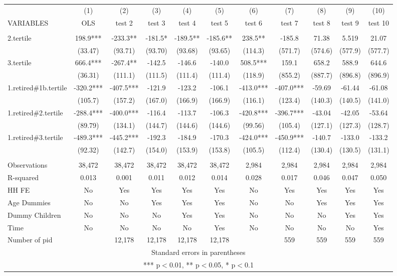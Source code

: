 \begin{tabular}{lcccccccccc} \hline
 & (1) & (2) & (3) & (4) & (5) & (6) & (7) & (8) & (9) & (10) \\
VARIABLES & OLS & test 2 & test 3 & test 4 & test 5 & test 6 & test 7 & test 8 & test 9 & test 10 \\ \hline
 &  &  &  &  &  &  &  &  &  &  \\
2.tertile & 198.9*** & -233.3** & -181.5* & -189.5** & -185.6** & 238.5** & -185.8 & 71.38 & 5.519 & 21.07 \\
 & (33.47) & (93.71) & (93.70) & (93.68) & (93.65) & (114.3) & (571.7) & (574.6) & (577.9) & (577.7) \\
3.tertile & 666.4*** & -267.4** & -142.5 & -146.6 & -140.0 & 508.5*** & 159.1 & 658.2 & 588.9 & 644.6 \\
 & (36.31) & (111.1) & (111.5) & (111.4) & (111.4) & (118.9) & (855.2) & (887.7) & (896.8) & (896.9) \\
1.retired\#1b.tertile & -320.2*** & -407.5*** & -121.9 & -123.2 & -106.1 & -413.0*** & -407.0*** & -59.69 & -61.44 & -61.08 \\
 & (105.7) & (157.2) & (167.0) & (166.9) & (166.9) & (116.1) & (123.4) & (140.3) & (140.5) & (141.0) \\
1.retired\#2.tertile & -288.4*** & -400.0*** & -116.4 & -113.7 & -106.3 & -420.8*** & -396.7*** & -43.04 & -42.05 & -53.64 \\
 & (89.79) & (134.1) & (144.7) & (144.6) & (144.6) & (99.56) & (105.4) & (127.1) & (127.3) & (128.7) \\
1.retired\#3.tertile & -489.3*** & -445.2*** & -192.3 & -184.9 & -170.3 & -424.0*** & -450.9*** & -140.7 & -133.0 & -133.2 \\
 & (92.32) & (142.7) & (154.0) & (153.9) & (153.8) & (105.5) & (112.4) & (130.4) & (130.5) & (131.1) \\
 &  &  &  &  &  &  &  &  &  &  \\
Observations & 38,472 & 38,472 & 38,472 & 38,472 & 38,472 & 2,984 & 2,984 & 2,984 & 2,984 & 2,984 \\
R-squared & 0.013 & 0.001 & 0.011 & 0.012 & 0.014 & 0.028 & 0.017 & 0.046 & 0.047 & 0.050 \\
HH FE & No & Yes & Yes & Yes & Yes & No & Yes & Yes & Yes & Yes \\
Age Dummies & No & No & Yes & Yes & Yes & No & No & Yes & Yes & Yes \\
Dummy Children & No & No & No & Yes & Yes & No & No & No & Yes & Yes \\
Time & No & No & No & No & Yes & No & No & No & No & Yes \\
 Number of pid &  & 12,178 & 12,178 & 12,178 & 12,178 &  & 559 & 559 & 559 & 559 \\ \hline
\multicolumn{11}{c}{ Standard errors in parentheses} \\
\multicolumn{11}{c}{ *** p$<$0.01, ** p$<$0.05, * p$<$0.1} \\
\end{tabular}
